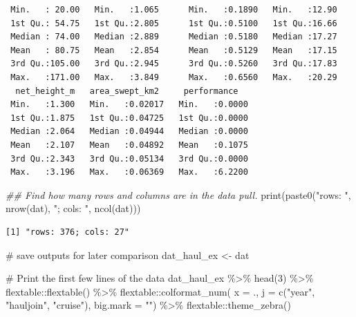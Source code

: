\documentclass[
  letterpaper,
  oneside,
  open=any]{scrbook}
\newenvironment{Shaded}{\begin{snugshade}}{\end{snugshade}}
\newcommand{\AttributeTok}[1]{\textcolor[rgb]{0.40,0.45,0.13}{#1}}
\newcommand{\CommentTok}[1]{\textcolor[rgb]{0.37,0.37,0.37}{#1}}
\newcommand{\DecValTok}[1]{\textcolor[rgb]{0.68,0.00,0.00}{#1}}
\newcommand{\DocumentationTok}[1]{\textcolor[rgb]{0.37,0.37,0.37}{\textit{#1}}}
\newcommand{\FunctionTok}[1]{\textcolor[rgb]{0.28,0.35,0.67}{#1}}
\newcommand{\NormalTok}[1]{\textcolor[rgb]{0.00,0.23,0.31}{#1}}
\newcommand{\OtherTok}[1]{\textcolor[rgb]{0.00,0.23,0.31}{#1}}
\newcommand{\SpecialCharTok}[1]{\textcolor[rgb]{0.37,0.37,0.37}{#1}}
\newcommand{\StringTok}[1]{\textcolor[rgb]{0.13,0.47,0.30}{#1}}
\begin{document}
\begin{verbatim}
 Min.   : 20.00   Min.   :1.065      Min.   :0.1890   Min.   :12.90  
 1st Qu.: 54.75   1st Qu.:2.805      1st Qu.:0.5100   1st Qu.:16.66  
 Median : 74.00   Median :2.889      Median :0.5180   Median :17.27  
 Mean   : 80.75   Mean   :2.854      Mean   :0.5129   Mean   :17.15  
 3rd Qu.:105.00   3rd Qu.:2.945      3rd Qu.:0.5260   3rd Qu.:17.83  
 Max.   :171.00   Max.   :3.849      Max.   :0.6560   Max.   :20.29  
  net_height_m   area_swept_km2     performance    
 Min.   :1.300   Min.   :0.02017   Min.   :0.0000  
 1st Qu.:1.875   1st Qu.:0.04725   1st Qu.:0.0000  
 Median :2.064   Median :0.04944   Median :0.0000  
 Mean   :2.107   Mean   :0.04892   Mean   :0.1075  
 3rd Qu.:2.343   3rd Qu.:0.05134   3rd Qu.:0.0000  
 Max.   :3.196   Max.   :0.06369   Max.   :6.2200  
\end{verbatim}

\begin{Shaded}
\begin{Highlighting}[]
\DocumentationTok{\#\# Find how many rows and columns are in the data pull. }
\FunctionTok{print}\NormalTok{(}\FunctionTok{paste0}\NormalTok{(}\StringTok{"rows: "}\NormalTok{, }\FunctionTok{nrow}\NormalTok{(dat), }\StringTok{"; cols: "}\NormalTok{, }\FunctionTok{ncol}\NormalTok{(dat)))}
\end{Highlighting}
\end{Shaded}

\begin{verbatim}
[1] "rows: 376; cols: 27"
\end{verbatim}

\begin{Shaded}
\begin{Highlighting}[]
\CommentTok{\# save outputs for later comparison}
\NormalTok{dat\_haul\_ex }\OtherTok{\textless{}{-}}\NormalTok{ dat}
\end{Highlighting}
\end{Shaded}

\begin{Shaded}
\begin{Highlighting}[]
\CommentTok{\# Print the first few lines of the data }
\NormalTok{dat\_haul\_ex }\SpecialCharTok{\%\textgreater{}\%} 
  \FunctionTok{head}\NormalTok{(}\DecValTok{3}\NormalTok{) }\SpecialCharTok{\%\textgreater{}\%} 
\NormalTok{  flextable}\SpecialCharTok{::}\FunctionTok{flextable}\NormalTok{() }\SpecialCharTok{\%\textgreater{}\%}
\NormalTok{  flextable}\SpecialCharTok{::}\FunctionTok{colformat\_num}\NormalTok{(}
      \AttributeTok{x =}\NormalTok{ ., }
      \AttributeTok{j =} \FunctionTok{c}\NormalTok{(}\StringTok{"year"}\NormalTok{, }\StringTok{"hauljoin"}\NormalTok{, }\StringTok{"cruise"}\NormalTok{), }
      \AttributeTok{big.mark =} \StringTok{""}\NormalTok{) }\SpecialCharTok{\%\textgreater{}\%} 
\NormalTok{  flextable}\SpecialCharTok{::}\FunctionTok{theme\_zebra}\NormalTok{()}
\end{Highlighting}
\end{Shaded}
\end{document}
